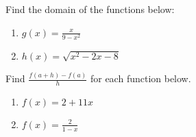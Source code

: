 \documentclass[11pt]{article}
\begin{document}
{} Find the domain of the functions below:
\begin{enumerate}
\item $g(x)=\frac{x}{9-x^2}$
\vfill
\item $h(x)=\sqrt{x^2-2x-8}$
\vfill
\end{enumerate}
\newpage

{} Find $\frac{f(a+h)-f(a)}{h}$ for each function below.
  \begin{enumerate}
  \item $f(x)=2+11x$
  \vfill
  \item $f(x)=\frac{2}{1-x}$
  \vfill
  \end{enumerate}
\end{document}
